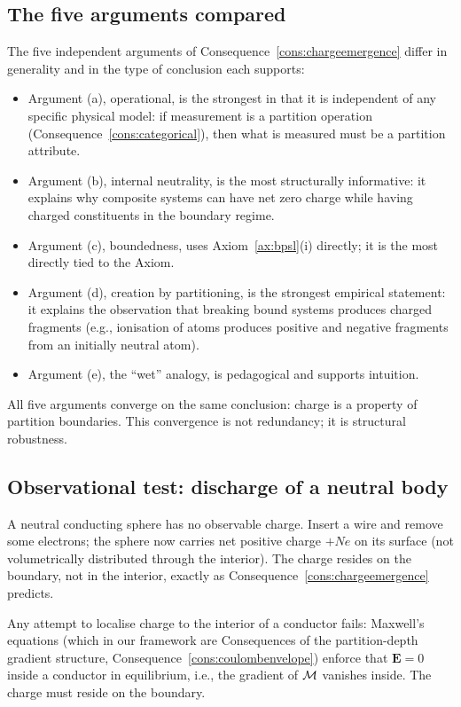 \subsection{The five arguments compared}

The five independent arguments of Consequence~\ref{cons:chargeemergence} differ in generality and in the type of conclusion each supports:
\begin{itemize}
\item Argument (a), operational, is the strongest in that it is independent of any specific physical model: if measurement is a partition operation (Consequence~\ref{cons:categorical}), then what is measured must be a partition attribute.
\item Argument (b), internal neutrality, is the most structurally informative: it explains why composite systems can have net zero charge while having charged constituents in the boundary regime.
\item Argument (c), boundedness, uses Axiom~\ref{ax:bpsl}(i) directly; it is the most directly tied to the Axiom.
\item Argument (d), creation by partitioning, is the strongest empirical statement: it explains the observation that breaking bound systems produces charged fragments (e.g., ionisation of atoms produces positive and negative fragments from an initially neutral atom).
\item Argument (e), the ``wet'' analogy, is pedagogical and supports intuition.
\end{itemize}

All five arguments converge on the same conclusion: charge is a property of partition boundaries. This convergence is not redundancy; it is structural robustness.

\subsection{Observational test: discharge of a neutral body}

A neutral conducting sphere has no observable charge. Insert a wire and remove some electrons; the sphere now carries net positive charge $+Ne$ on its surface (not volumetrically distributed through the interior). The charge resides on the boundary, not in the interior, exactly as Consequence~\ref{cons:chargeemergence} predicts.

Any attempt to localise charge to the interior of a conductor fails: Maxwell's equations (which in our framework are Consequences of the partition-depth gradient structure, Consequence~\ref{cons:coulombenvelope}) enforce that $\mathbf{E}=0$ inside a conductor in equilibrium, i.e., the gradient of $\mathcal{M}$ vanishes inside. The charge must reside on the boundary.

